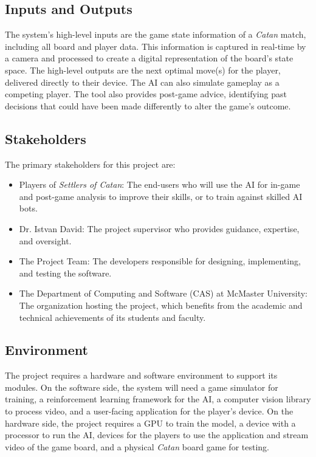\documentclass{article}
\begin{document}
\subsection{Inputs and Outputs}
The system's high-level inputs are the game state information of a \emph{Catan} match, including all board and player data.
This information is captured in real-time by a camera and processed to create a digital representation of the board's state space.
The high-level outputs are the next optimal move(s) for the player, delivered directly to their device.
The AI can also simulate gameplay as a competing player.
The tool also provides post-game advice, identifying past decisions that could have been made differently to alter the game's outcome.

\subsection{Stakeholders}\label{subsec:stakeholders}
The primary stakeholders for this project are:
\begin{itemize}
    \item Players of \emph{Settlers of Catan}: The end-users who will use the AI for in-game and post-game analysis to improve their skills, or to train against skilled AI bots.
    \item Dr. Istvan David: The project supervisor who provides guidance, expertise, and oversight.
    \item The Project Team: The developers responsible for designing, implementing, and testing the software.
    \item The Department of Computing and Software (CAS) at McMaster University: The organization hosting the project, which benefits from the academic and technical achievements of its students and faculty.
\end{itemize}

\subsection{Environment}
The project requires a hardware and software environment to support its modules. On the software side, the system will need a game simulator for training, a reinforcement learning framework for the AI, a computer vision library to process video, and a user-facing application for the player's device. On the hardware side, the project requires a GPU to train the model, a device with a processor to run the AI, devices for the players to use the application and stream video of the game board, and a physical \emph{Catan} board game for testing.
\end{document}
